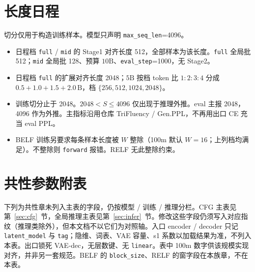 \documentclass[UTF8,a4paper,11pt]{ctexart}
\begin{document}
\appendix
\section{长度日程}
\label{sec:len}

切分仅用于构造训练样本。模型只声明 \texttt{max\_seq\_len}=4096。

\begin{itemize}
  \item 日程档 \texttt{full} / \texttt{mid} 的 Stage1 对齐长度 512，全部样本为该长度。\texttt{full} 全局批 512；\texttt{mid} 全局批 128、预算 \(10\mathrm{B}\)、\texttt{eval\_step}=1000，无 Stage2。
  \item 日程档 \texttt{full} 的扩展对齐长度 2048；\(5\mathrm{B}\) 按档 token 比 \(1{:}2{:}3{:}4\) 分成 \(0.5{+}1.0{+}1.5{+}2.0\,\mathrm{B}\)，档 \(\{256,512,1024,2048\}\)。
  \item 训练切分止于 2048。\(2048<S\le 4096\) 仅出现于推理外推。eval 主报 2048，4096 作为外推。主指标沿用仓库 TriFluency / Gen.PPL，不再用出口 CE 充当 eval PPL。
  \item BELF 训练另要求每条样本长度被 \(W\) 整除（100m 默认 \(W=16\)；上列档均满足）。不整除则 \texttt{forward} 报错。RELF 无此整除约束。
\end{itemize}

\section{共性参数附表}

下列为共性章未列入主表的字段，仍按模型 / 训练 / 推理分栏。CFG 主表见第~\ref{sec:cfg}~节，全局推理主表见第~\ref{sec:infer}~节。修改这些字段仍须写入对应指纹（推理类除外），但本文档不以它们为对照轴。入口 encoder / decoder 只记 \texttt{latent\_model} 与 \texttt{tag}；隐维、词表、VAE 容量、s1 系数以加载结果为准，不列入本表。出口锁死 VAE-dec，无层数键、无 \texttt{linear}。表中 100m 数字供该规模实现对齐，并非另一套规范。BELF 的 \texttt{block\_size}、RELF 的窗字段在本族章，不在本表。
\end{document}
